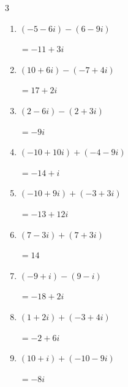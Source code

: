 \begin{multicols}{3}
\begin{enumerate}
  \item $\displaystyle (-5-6i) - (6-9i)$

        $\displaystyle =-11+3i$

  \item $\displaystyle (10+6i) - (-7+4i)$

        $\displaystyle =17+2i$

  \item $\displaystyle (2-6i) - (2+3i)$

        $\displaystyle =-9i$

  \item $\displaystyle (-10+10i) + (-4-9i)$

        $\displaystyle =-14+i$

  \item $\displaystyle (-10+9i) + (-3+3i)$

        $\displaystyle =-13+12i$

  \item $\displaystyle (7-3i) + (7+3i)$

        $\displaystyle =14$

  \item $\displaystyle (-9+i) - (9-i)$

        $\displaystyle =-18+2i$

  \item $\displaystyle (1+2i) + (-3+4i)$

        $\displaystyle =-2+6i$

  \item $\displaystyle (10+i) + (-10-9i)$

        $\displaystyle =-8i$

\end{enumerate}
\end{multicols}
